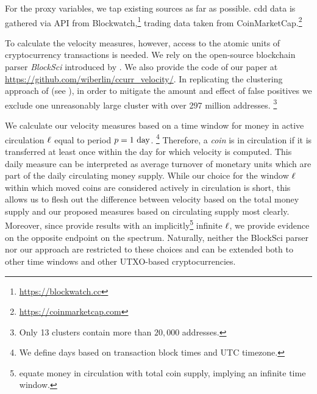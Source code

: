For the proxy variables, we tap existing sources as far as possible.  %
\Ac{cdd} data is gathered via API from
Blockwatch,\footnote{\url{https://blockwatch.cc}} %
trading data taken from
CoinMarketCap.\footnote{\url{https://coinmarketcap.com}}  %

To calculate the velocity measures, however, access to the atomic units of
cryptocurrency transactions is needed.  %
We rely on the open-source blockchain parser \emph{BlockSci} introduced by
\cite{kalodner2017blocksci}.  %
We also provide the code of our paper at
\url{https://github.com/wiberlin/ccurr_velocity/}. %
In replicating the clustering approach of \cite{kalodner2017blocksci} (see
), in order to mitigate the
amount and effect of false positives we exclude one unreasonably large
cluster with over 297 million addresses.  %
\footnote{Only 13 clusters contain more than $20,000$ addresses.}  %

We calculate our velocity measures based on a time window for money in active
circulation ${\ell}$ equal to period ${p} = 1 \text{ day}$.%
\footnote{We define days based on transaction block times and UTC
  timezone.} %
Therefore, a \textit{coin} is in circulation if it is transferred at least
once within the day for which velocity is computed.  %
This daily measure can be interpreted as average turnover of monetary units
which are part of the daily circulating money supply.  %
While our choice for the window ${\ell}$ within which moved coins are
considered actively in circulation is short, this allows us to flesh out the
difference between velocity based on the total money supply and our proposed
measures based on circulating supply most clearly.  Moreover, since
\cite{kalodner2017blocksci} provide results with an
implicitly\footnote{\cite{kalodner2017blocksci} equate money in circulation
  with total coin supply, implying an infinite time window.}  %
infinite ${\ell}$, we provide evidence on the opposite endpoint on the
spectrum.  %
Naturally, neither the BlockSci parser nor our approach are restricted to
these choices and can be extended both to other time windows and other
UTXO-based cryptocurrencies.  %

